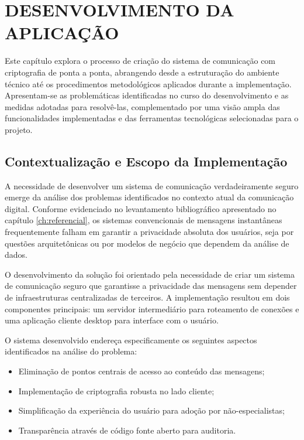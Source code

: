 \section{DESENVOLVIMENTO DA APLICAÇÃO}

Este capítulo explora o processo de criação do sistema de comunicação
com criptografia de ponta a ponta, abrangendo desde a estruturação do
ambiente técnico até os procedimentos metodológicos aplicados durante
a implementação. Apresentam-se as problemáticas identificadas no
curso do desenvolvimento e as medidas adotadas para resolvê-las,
complementado por uma visão ampla das funcionalidades implementadas e
das ferramentas tecnológicas selecionadas para o projeto.

\subsection{Contextualização e Escopo da Implementação}

A necessidade de desenvolver um sistema de comunicação
verdadeiramente seguro emerge da análise dos problemas identificados
no contexto atual da comunicação digital. Conforme evidenciado no
levantamento bibliográfico apresentado no capítulo
\ref{ch:referencial}, os sistemas
convencionais de mensagens instantâneas frequentemente falham em
garantir a privacidade absoluta dos usuários, seja por questões
arquitetônicas ou por modelos de negócio que dependem da análise de dados.

O desenvolvimento da solução foi orientado pela necessidade de criar
um sistema de comunicação seguro que garantisse a privacidade das
mensagens sem depender de infraestruturas centralizadas de terceiros.
A implementação resultou em dois componentes principais: um servidor
intermediário para roteamento de conexões e uma aplicação cliente
desktop para interface com o usuário.

O sistema desenvolvido endereça especificamente os seguintes aspectos
identificados na análise do problema:

\begin{itemize}
  \item Eliminação de pontos centrais de acesso ao conteúdo das mensagens;
  \item Implementação de criptografia robusta no lado cliente;
  \item Simplificação da experiência do usuário para adoção por
    não-especialistas;
  \item Transparência através de código fonte aberto para auditoria.
\end{itemize}

